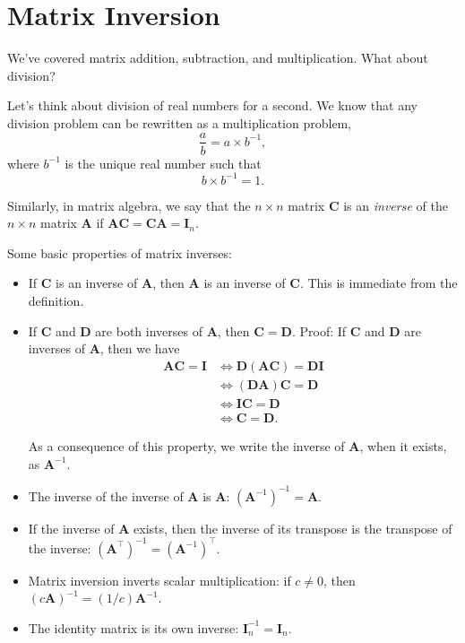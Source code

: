 \documentclass[
  12pt,
  oneside,openany]{book}
\begin{document}
\hypertarget{matrix-inversion}{%
\section{Matrix Inversion}\label{matrix-inversion}}

We've covered matrix addition, subtraction, and multiplication. What about division?

Let's think about division of real numbers for a second. We know that any division problem can be rewritten as a multiplication problem,
\[
\frac{a}{b} = a \times b^{-1},
\]
where \(b^{-1}\) is the unique real number such that
\[
b \times b^{-1} = 1.
\]

Similarly, in matrix algebra, we say that the \(n \times n\) matrix \(\mathbf{C}\) is an \emph{inverse} of the \(n \times n\) matrix \(\mathbf{A}\) if \(\mathbf{A} \mathbf{C} = \mathbf{C} \mathbf{A} = \mathbf{I}_n\).

Some basic properties of matrix inverses:

\begin{itemize}
\item
  If \(\mathbf{C}\) is an inverse of \(\mathbf{A}\), then \(\mathbf{A}\) is an inverse of \(\mathbf{C}\). This is immediate from the definition.
\item
  If \(\mathbf{C}\) and \(\mathbf{D}\) are both inverses of \(\mathbf{A}\), then \(\mathbf{C} = \mathbf{D}\). Proof: If \(\mathbf{C}\) and \(\mathbf{D}\) are inverses of \(\mathbf{A}\), then we have
  \[
  \begin{aligned}
  \mathbf{A} \mathbf{C} = \mathbf{I}
  &\Leftrightarrow \mathbf{D} (\mathbf{A} \mathbf{C}) = \mathbf{D} \mathbf{I} \\
  &\Leftrightarrow (\mathbf{D} \mathbf{A}) \mathbf{C} = \mathbf{D} \\
  &\Leftrightarrow \mathbf{I} \mathbf{C} = \mathbf{D} \\
  &\Leftrightarrow \mathbf{C} = \mathbf{D}.
  \end{aligned}
  \]

  As a consequence of this property, we write the inverse of \(\mathbf{A}\), when it exists, as \(\mathbf{A}^{-1}\).
\item
  The inverse of the inverse of \(\mathbf{A}\) is \(\mathbf{A}\): \((\mathbf{A}^{-1})^{-1} = \mathbf{A}\).
\item
  If the inverse of \(\mathbf{A}\) exists, then the inverse of its transpose is the transpose of the inverse: \((\mathbf{A}^\top)^{-1} = (\mathbf{A}^{-1})^\top\).
\item
  Matrix inversion inverts scalar multiplication: if \(c \neq 0\), then \((c \mathbf{A})^{-1} = (1/c) \mathbf{A}^{-1}\).
\item
  The identity matrix is its own inverse: \(\mathbf{I}_n^{-1} = \mathbf{I}_n\).
\end{itemize}
\end{document}
